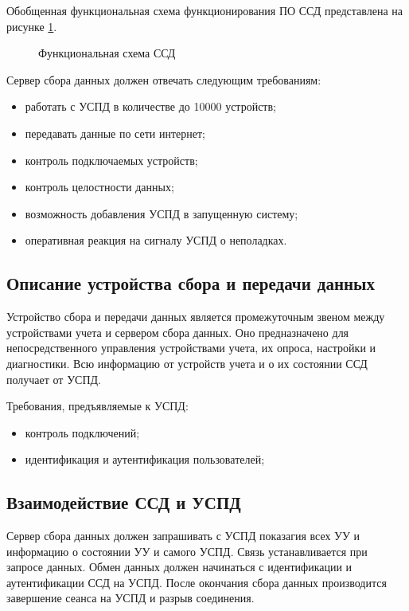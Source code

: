 Обобщенная функциональная схема функционирования ПО ССД представлена на рисунке \ref{fs_ssd:fs_ssd}.

\begin{figure}[h!]
 \caption{Функциональная схема ССД}
 \label{fs_ssd:fs_ssd}
\end{figure}

Сервер сбора данных должен отвечать следующим требованиям:

\begin{itemize}
 \item работать с УСПД в количестве до 10000 устройств;
 \item передавать данные по сети интернет;
 \item контроль подключаемых устройств;
 \item контроль целостности данных;
 \item возможность добавления УСПД в запущенную систему;
 \item оперативная реакция на сигналу УСПД о неполадках.
\end{itemize}

\subsection{Описание устройства сбора и передачи данных}%

Устройство сбора и передачи данных является промежуточным звеном между устройствами учета и сервером сбора данных. Оно предназначено для непосредственного управления устройствами учета, их опроса, настройки и диагностики. Всю информацию от устройств учета и о их состоянии ССД получает от УСПД.

Требования, предъявляемые к УСПД:

\begin{itemize}
 \item контроль подключений;
 \item идентификация и аутентификация пользователей;
\end{itemize}

\subsection{Взаимодействие ССД и УСПД}

Сервер сбора данных должен запрашивать с УСПД показагия всех УУ и информацию о состоянии УУ и самого УСПД. Связь устанавливается при запросе данных. Обмен данных должен начинаться с идентификации и аутентификации ССД на УСПД. После окончания сбора данных производится завершение сеанса на УСПД и разрыв соединения.

